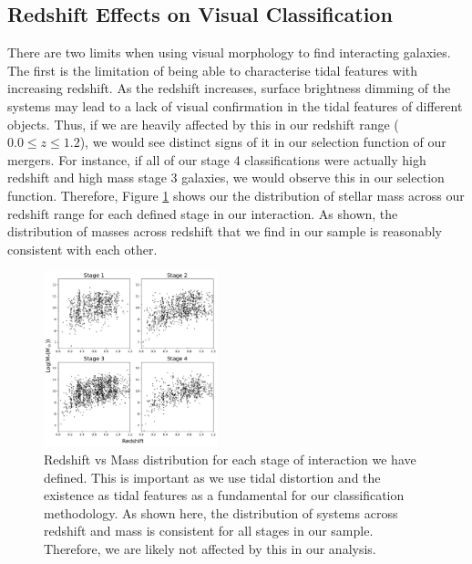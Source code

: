 \subsection{Redshift Effects on Visual Classification}
\noindent There are two limits when using visual morphology to find interacting galaxies. The first is the limitation of being able to characterise tidal features with increasing redshift. As the redshift increases, surface brightness dimming of the systems may lead to a lack of visual confirmation in the tidal features of different objects. Thus, if we are heavily affected by this in our redshift range ($0.0 \leq z \leq 1.2$), we would see distinct signs of it in our selection function of our mergers. For instance, if all of our stage 4 classifications were actually high redshift and high mass stage 3 galaxies, we would observe this in our selection function. Therefore, Figure \ref{fig:redshift_selection} shows our the distribution of stellar mass across our redshift range for each defined stage in our interaction. As shown, the distribution of masses across redshift that we find in our sample is reasonably consistent with each other.

\begin{figure}
    \centering
    \includegraphics[width=0.45\textwidth]{Chapter3/figures/stage-selection.pdf}
    \caption{Redshift vs Mass distribution for each stage of interaction we have defined. This is important as we use tidal distortion and the existence as tidal features as a fundamental for our classification methodology. As shown here, the distribution of systems across redshift and mass is consistent for all stages in our sample. Therefore, we are likely not affected by this in our analysis.}
    \label{fig:redshift_selection}
\end{figure}

